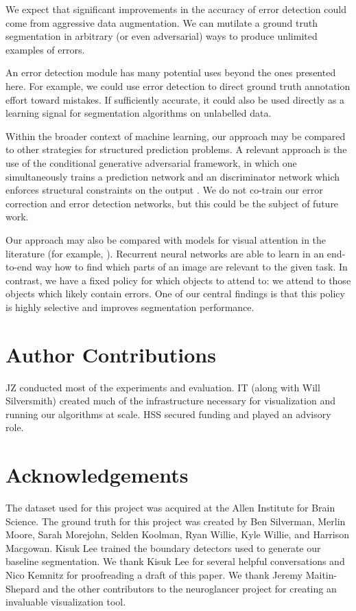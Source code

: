 \documentclass{article}
\begin{document}
We expect that significant improvements in the accuracy of error detection could come from aggressive data augmentation. We can mutilate a ground truth segmentation in arbitrary (or even adversarial) ways to produce unlimited examples of errors.

An error detection module has many potential uses beyond the ones presented here. For example, we could use error detection to direct ground truth annotation effort toward mistakes. If sufficiently accurate, it could also be used directly as a learning signal for segmentation algorithms on unlabelled data.

Within the broader context of machine learning, our approach may be compared to other strategies for structured prediction problems. A relevant approach is the use of the conditional generative adversarial framework, in which one simultaneously trains a prediction network and an discriminator network which enforces structural constraints on the output \cite{cgan1,cgan2}. We do not co-train our error correction and error detection networks, but this could be the subject of future work. 

Our approach may also be compared with models for visual attention in the literature (for example, \cite{recurrent_attention}). Recurrent neural networks are able to learn in an end-to-end way how to find which parts of an image are relevant to the given task. In contrast, we have a fixed policy for which objects to attend to: we attend to those objects which likely contain errors. One of our central findings is that this policy is highly selective and improves segmentation performance.

\section{Author Contributions}
JZ conducted most of the experiments and evaluation. IT (along with
Will Silversmith) created much of the infrastructure necessary for visualization and running
our algorithms at scale. HSS secured funding and played an advisory role.

\section{Acknowledgements}
The dataset used for this project was acquired at the Allen Institute for Brain Science.
The ground truth for this project was created by Ben Silverman, Merlin Moore, Sarah Morejohn, 
Selden Koolman, Ryan Willie, Kyle Willie, and Harrison Macgowan. Kisuk Lee trained the boundary
detectors used to generate our baseline segmentation. We thank Kisuk Lee for several
helpful conversations and Nico Kemnitz for proofreading a draft of this paper. We thank 
Jeremy Maitin-Shepard and the other contributors to the neuroglancer project for creating an 
invaluable visualization tool.
\end{document}
